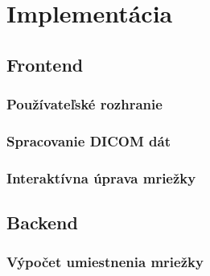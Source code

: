 \chapter {Implementácia}

\section {Frontend}

\subsection {Používateľské rozhranie}

\subsection {Spracovanie DICOM dát}

\subsection {Interaktívna úprava mriežky}

\section {Backend}

\subsection {Výpočet umiestnenia mriežky}
